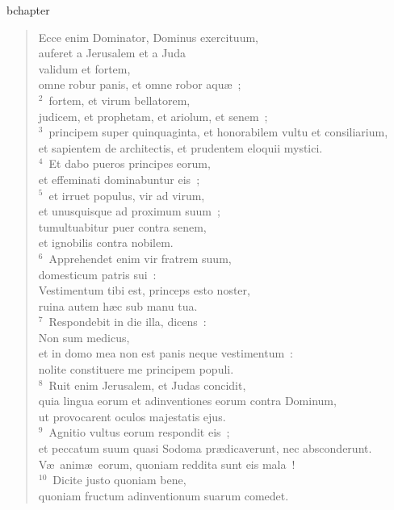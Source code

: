 bchapter\begin{verse}\vspace{-19pt}Ecce enim Dominator, Dominus exercituum,\\ auferet a Jerusalem et a Juda\\ validum et fortem,\\ omne robur panis, et omne robor aqu\ae~;\\
${}^{2}$~fortem, et virum bellatorem,\\ judicem, et prophetam, et ariolum, et senem~;\\
${}^{3}$~principem super quinquaginta, et honorabilem vultu et consiliarium,\\ et sapientem de architectis, et prudentem eloquii mystici.\\
${}^{4}$~Et dabo pueros principes eorum,\\ et effeminati dominabuntur eis~;\\
${}^{5}$~et irruet populus, vir ad virum,\\ et unusquisque ad proximum suum~;\\ tumultuabitur puer contra senem,\\ et ignobilis contra nobilem.\\
${}^{6}$~Apprehendet enim vir fratrem suum,\\ domesticum patris sui~:\\ Vestimentum tibi est, princeps esto noster,\\ ruina autem h\ae c sub manu tua.\\
${}^{7}$~Respondebit in die illa, dicens~:\\ Non sum medicus,\\ et in domo mea non est panis neque vestimentum~:\\ nolite constituere me principem populi.\\
${}^{8}$~Ruit enim Jerusalem, et Judas concidit,\\ quia lingua eorum et adinventiones eorum contra Dominum,\\ ut provocarent oculos majestatis ejus.\\
${}^{9}$~Agnitio vultus eorum respondit eis~;\\ et peccatum suum quasi Sodoma pr\ae dicaverunt, nec absconderunt.\\ V\ae\ anim\ae\ eorum, quoniam reddita sunt eis mala~!\\
${}^{10}$~Dicite justo quoniam bene,\\ quoniam fructum adinventionum suarum comedet.\\

\end{verse}
